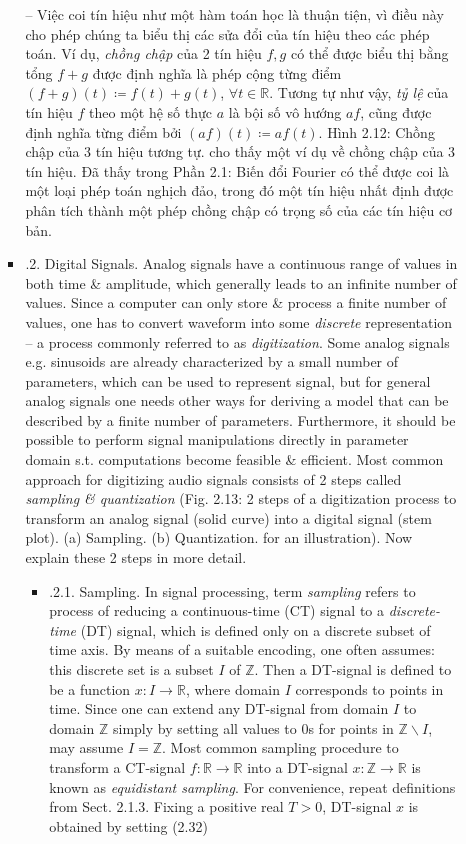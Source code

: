 \documentclass{article}
\begin{document}
\begin{itemize}
\begin{itemize}
\begin{itemize}
			-- Việc coi tín hiệu như một hàm toán học là thuận tiện, vì điều này cho phép chúng ta biểu thị các sửa đổi của tín hiệu theo các phép toán. Ví dụ, {\it chồng chập} của 2 tín hiệu $f,g$ có thể được biểu thị bằng tổng $f + g$ được định nghĩa là phép cộng từng điểm $(f + g)(t)\coloneqq f(t) + g(t)$, $\forall t\in\mathbb{R}$. Tương tự như vậy, {\it tỷ lệ} của tín hiệu $f$ theo một hệ số thực $a$ là bội số vô hướng $af$, cũng được định nghĩa từng điểm bởi $(af)(t)\coloneqq af(t)$. {\sf Hình 2.12: Chồng chập của 3 tín hiệu tương tự.} cho thấy một ví dụ về chồng chập của 3 tín hiệu. Đã thấy trong Phần 2.1: Biến đổi Fourier có thể được coi là một loại phép toán nghịch đảo, trong đó một tín hiệu nhất định được phân tích thành một phép chồng chập có trọng số của các tín hiệu cơ bản.
			\item {.2. Digital Signals.} Analog signals have a continuous range of values in both time \& amplitude, which generally leads to an infinite number of values. Since a computer can only store \& process a finite number of values, one has to convert waveform into some {\it discrete} representation -- a process commonly referred to as {\it digitization}. Some analog signals e.g. sinusoids are already characterized by a small number of parameters, which can be used to represent signal, but for general analog signals one needs other ways for deriving a model that can be described by a finite number of parameters. Furthermore, it should be possible to perform signal manipulations directly in parameter domain s.t. computations become feasible \& efficient. Most common approach for digitizing audio signals consists of 2 steps called {\it sampling \& quantization} ({\sf Fig. 2.13: 2 steps of a digitization process to transform an analog signal (solid curve) into a digital signal (stem plot). (a) Sampling. (b) Quantization.} for an illustration). Now explain these 2 steps in more detail.
			\begin{itemize}
				\item {.2.1. Sampling.} In signal processing, term {\it sampling} refers to process of reducing a continuous-time (CT) signal to a {\it discrete-time} (DT) signal, which is defined only on a discrete subset of time axis. By means of a suitable encoding, one often assumes: this discrete set is a subset $I$ of $\mathbb{Z}$. Then a DT-signal is defined to be a function $x:I\to\mathbb{R}$, where domain $I$ corresponds to points in time. Since one can extend any DT-signal from domain $I$ to domain $\mathbb{Z}$ simply by setting all values to 0s for points in $\mathbb{Z}\backslash I$, may assume $I = \mathbb{Z}$. Most common sampling procedure to transform a CT-signal $f:\mathbb{R}\to\mathbb{R}$ into a DT-signal $x:\mathbb{Z}\to\mathbb{R}$ is known as {\it equidistant sampling}. For convenience, repeat definitions from Sect. 2.1.3. Fixing a positive real $T > 0$, DT-signal $x$ is obtained by setting (2.32)

\end{itemize}
\end{itemize}
\end{itemize}
\end{itemize}
\end{document}
